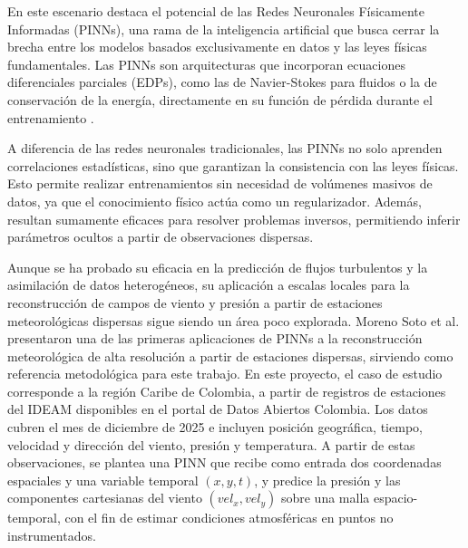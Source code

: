 En este escenario destaca el potencial de las Redes Neuronales Físicamente Informadas (PINNs), una rama de la inteligencia artificial que busca cerrar la brecha entre los modelos basados exclusivamente en datos y las leyes físicas fundamentales. Las PINNs son arquitecturas que incorporan ecuaciones diferenciales parciales (EDPs), como las de Navier-Stokes para fluidos o la de conservación de la energía, directamente en su función de pérdida durante el entrenamiento \citep{cai2021physics}.

A diferencia de las redes neuronales tradicionales, las PINNs no solo aprenden correlaciones estadísticas, sino que garantizan la consistencia con las leyes físicas. Esto permite realizar entrenamientos sin necesidad de volúmenes masivos de datos, ya que el conocimiento físico actúa como un regularizador. Además, resultan sumamente eficaces para resolver problemas inversos, permitiendo inferir parámetros ocultos a partir de observaciones dispersas.

Aunque se ha probado su eficacia en la predicción de flujos turbulentos y la asimilación de datos heterogéneos, su aplicación a escalas locales para la reconstrucción de campos de viento y presión a partir de estaciones meteorológicas dispersas sigue siendo un área poco explorada. Moreno Soto et al. \cite{morenosoto2024pinns} presentaron una de las primeras aplicaciones de PINNs a la reconstrucción meteorológica de alta resolución a partir de estaciones dispersas, sirviendo como referencia metodológica para este trabajo. En este proyecto, el caso de estudio corresponde a la región Caribe de Colombia, a partir de registros de estaciones del IDEAM disponibles en el portal de Datos Abiertos Colombia. Los datos cubren el mes de diciembre de 2025 e incluyen posición geográfica, tiempo, velocidad y dirección del viento, presión y temperatura. A partir de estas observaciones, se plantea una PINN que recibe como entrada dos coordenadas espaciales y una variable temporal $(x, y, t)$, y predice la presión y las componentes cartesianas del viento $(vel_x, vel_y)$ sobre una malla espacio-temporal, con el fin de estimar condiciones atmosféricas en puntos no instrumentados.